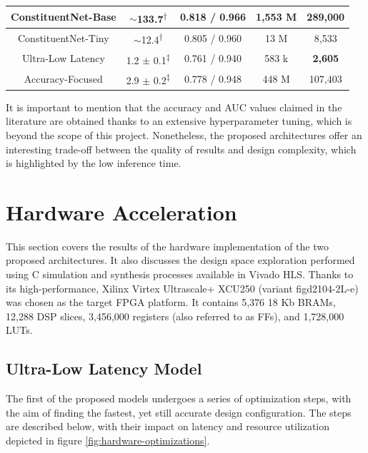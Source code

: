 \begin{table}[!hpt]
\begin{tabular}{|c|c|c|c|c|}
  ConstituentNet-Base \cite{3-yuan2021msc} & $\sim$133.7\textsuperscript{$\dagger$} & 0.818 / \textbf{0.966} & 1,553 M & 289,000 \\ \hline
  ConstituentNet-Tiny \cite{3-yuan2021msc} & $\sim$12.4\textsuperscript{$\dagger$} & 0.805 / 0.960 & 13 M  & 8,533 \\ \hline \hline
  Ultra-Low Latency & 1.2 $\pm$ 0.1\textsuperscript{$\ddagger$} & 0.761 / 0.940 & 583 k & \textbf{2,605} \\ \hline
  Accuracy-Focused & 2.9 $\pm$ 0.2\textsuperscript{$\ddagger$} & 0.778 / 0.948 & 448 M & 107,403 \\ \hline
  \end{tabular}
  \egroup
\end{table}

It is important to mention that the accuracy and AUC values claimed in the literature are obtained thanks to an extensive hyperparameter tuning, which is beyond the scope of this project. Nonetheless, the proposed architectures offer an interesting trade-off between the quality of results and design complexity, which is highlighted by the low inference time.

\section{Hardware Acceleration}
This section covers the results of the hardware implementation of the two proposed architectures. It also discusses the design space exploration performed using C simulation and synthesis processes available in Vivado HLS. Thanks to its high-performance, Xilinx Virtex Ultrascale+ XCU250 (variant figd2104-2L-e) was chosen as the target FPGA platform. It contains 5,376 18 Kb BRAMs, 12,288 DSP slices, 3,456,000 registers (also referred to as FFs), and 1,728,000 LUTs.

\subsection{Ultra-Low Latency Model}
The first of the proposed models undergoes a series of optimization steps, with the aim of finding the fastest, yet still accurate design configuration. The steps are described below, with their impact on latency and resource utilization depicted in figure \ref{fig:hardware-optimizations}.

